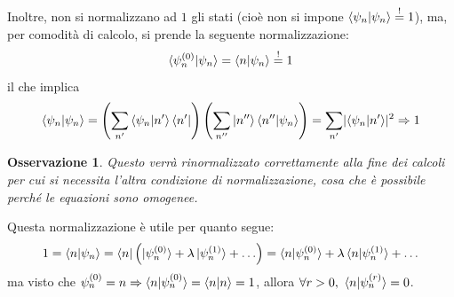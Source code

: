 \documentclass[11pt, a4paper]{scrartcl} %
\numberwithin{equation}{subsection}
\theoremstyle{style2}
\newtheorem{osservazione}{Osservazione}[section]
\theoremstyle{style1}
\begin{document}
Inoltre, non si normalizzano ad $1$ gli stati (cio\`e non si impone $\braket{\psi _n|\psi _n} \stackrel{!}{=} 1$), ma, per comodit\`a di calcolo, si prende la seguente normalizzazione:
\begin{equation}
	\braket{\psi _n^{(0)} |\psi _n} = \braket{n|\psi _n} \stackrel{!}{=}1
\end{equation}
il che implica 
\[
\braket{\psi _n|\psi _n} = \left(\sum_{n'}^{} \braket{\psi _n|n'} \bra{n'} \right) \left(\sum_{n''}^{} \ket{n''} \braket{n''|\psi _n} \right) = \sum_{n'}^{} \lvert \braket{\psi _n|n'}  \rvert ^2 \Rightarrow 1
\] 
\begin{osservazione}
Questo verr\`a rinormalizzato correttamente alla fine dei calcoli per cui si necessita l'altra condizione di normalizzazione, cosa che \`e possibile perch\'e le equazioni sono omogenee.
\end{osservazione}
Questa normalizzazione \`e utile per quanto segue:
\[
	1 = \braket{n|\psi _n} = \bra{n} \left(\ket{\psi _n^{(0)} }+ \lambda \ket{\psi ^{(1)}_n } + \ldots \right) = \braket{n|\psi ^{(0)} _n} + \lambda \braket{n|\psi ^{(1)} _n} + \ldots
\] 
ma visto che $\psi _n^{(0)} = n \Rightarrow  \braket{n|\psi ^{(0)} _n} = \braket{n|n} = 1$, allora $\forall r>0, \ \braket{n|\psi ^{(r)} _n} = 0$.
\end{document}
